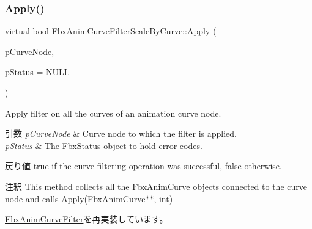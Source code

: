 \subsubsection{\texorpdfstring{Apply()}{Apply()}\hspace{0.1cm}{\footnotesize\ttfamily [4/5]}}
{\footnotesize\ttfamily virtual bool Fbx\+Anim\+Curve\+Filter\+Scale\+By\+Curve\+::\+Apply (\begin{DoxyParamCaption}\item[{\hyperlink{class_fbx_anim_curve_node}{Fbx\+Anim\+Curve\+Node} \&}]{p\+Curve\+Node,  }\item[{\hyperlink{class_fbx_status}{Fbx\+Status} $\ast$}]{p\+Status = {\ttfamily \hyperlink{fbxarch_8h_a070d2ce7b6bb7e5c05602aa8c308d0c4}{N\+U\+LL}} }\end{DoxyParamCaption})\hspace{0.3cm}{\ttfamily [virtual]}}

Apply filter on all the curves of an animation curve node. 
\begin{DoxyParams}{引数}
{\em p\+Curve\+Node} & Curve node to which the filter is applied. \\
\hline
{\em p\+Status} & The \hyperlink{class_fbx_status}{Fbx\+Status} object to hold error codes. \\
\hline
\end{DoxyParams}
\begin{DoxyReturn}{戻り値}
{\ttfamily true} if the curve filtering operation was successful, {\ttfamily false} otherwise. 
\end{DoxyReturn}
\begin{DoxyRemark}{注釈}
This method collects all the \hyperlink{class_fbx_anim_curve}{Fbx\+Anim\+Curve} objects connected to the curve node and calls Apply(\+Fbx\+Anim\+Curve$\ast$$\ast$, int) 
\end{DoxyRemark}


\hyperlink{class_fbx_anim_curve_filter_ad042b45c0675278fa49e61739b0825c2}{Fbx\+Anim\+Curve\+Filter}を再実装しています。

\mbox{\label{class_fbx_anim_curve_filter_scale_by_curve_a3914c0e65233ce6f2177d5d7e65c15ea}} 

